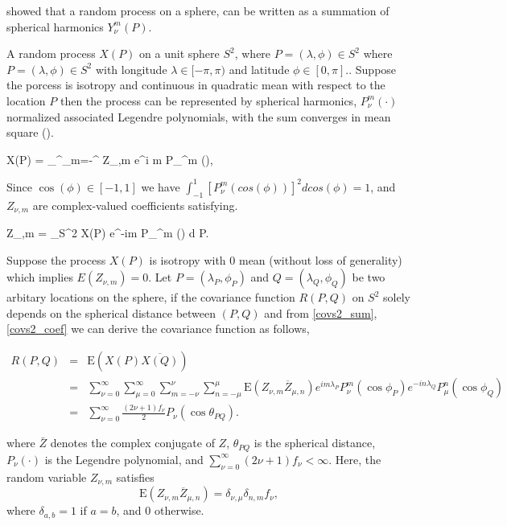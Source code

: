 	\cite{Jones1963} showed that a random process on a sphere, can be written as a summation of spherical harmonics $Y_{\nu}^m(P)$. 
	
	
	A random process $X(P)$ on a unit sphere $S^2$, where $P=(\lambda, \phi) \in S^2$ where $P=(\lambda, \phi) \in S^2$ with longitude $\lambda \in [-\pi, \pi)$ and latitude $\phi \in [0, \pi]$.. Suppose the porcess is isotropy and continuous in quadratic mean with respect to the location $P$ then the process can be represented by spherical harmonics, $P_{\nu}^m(\cdot)$ normalized associated Legendre polynomials, with the sum converges in mean square (\cite{LiNorth1997, Huang2012}).   
		
		\beq
		X(P) = \sum_{}^\infty \sum_{m=-\nu}^{\nu} Z_{\nu,m} e^{i m \lambda} P_{\nu}^m (\cos \phi),
		\eeq
		
		Since $\cos(\phi)\in[-1,1]$ we have $\int_{-1}^{1}[P_{\nu}^m(cos(\phi))]^2dcos(\phi) = 1$, and $Z_{\nu,m}$ are complex-valued coefficients satisfying.
		
		\beq
		Z_{\nu,m} = \int_{S^2} X(P) e^{-im \lambda} P_{\nu}^m (\cos \phi) d P.
		\eeq
			
		Suppose the process $X(P)$ is isotropy with 0 mean (without loss of generality) which implies $E(Z_{\nu,m}) = 0$. Let $P = (\lambda_P, \phi_P)$ and $Q=(\lambda_Q, \phi_Q)$ be two arbitary locations on the sphere, if the covariance function $R(P,Q)$ on $S^2$ solely depends on the spherical distance between $(P,Q)$ and from \ref{covs2_sum}, \ref{covs2_coef} we can derive the covariance function as follows,
			
		\begin{eqnarray} \label{rpq_1}
			R(P, Q) &=& \mbox{E}(X(P) \overline{X(Q)}) \nonumber \\
			&=& \sum_{\nu=0}^\infty \sum_{\mu=0}^\infty \sum_{m=-\nu}^{\nu} \sum_{n=-\mu}^{\mu} \mbox{E}(Z_{\nu,m} \overline{Z}_{\mu,n}) e^{im \lambda_P} P_{\nu}^m(\cos \phi_P) e^{-i n \lambda_Q} P_{\mu}^n (\cos \phi_Q) \nonumber \\
			&=& \sum_{\nu=0}^\infty \frac{(2\nu+1)f_{\nu}}{2} P_{\nu}(\cos \theta_{PQ}).
		\end{eqnarray}
			
		where $\bar{Z}$ denotes the complex conjugate of $Z$, $\theta_{PQ}$ is the spherical distance, $P_{\nu}(\cdot)$ is the Legendre polynomial, and $\sum_{\nu = 0}^{\infty} (2\nu+1)f_{\nu} < \infty$. Here, the random variable $Z_{\nu,m}$ satisfies
		\[
			\mbox{E} (Z_{\nu,m} \overline{Z}_{\mu,n}) = \delta_{\nu,\mu} \delta_{n,m} f_\nu,
		\]
		where $\delta_{a, b} = 1$ if $a = b$, and $0$ otherwise.
		
